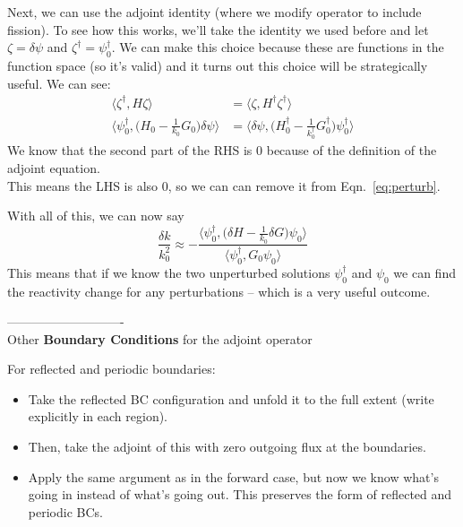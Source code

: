 \documentclass[12pt]{article}
\begin{document}
Next, we can use the adjoint identity (where we modify operator to include fission). To see how this works, we'll take the identity we used before and let $\zeta = \delta\psi$ and $\zeta^{\dagger} = \psi_0^{\dagger}$. We can make this choice because these are functions in the function space (so it's valid) and it turns out this choice will be strategically useful. We can see:
\begin{align*}
\langle\zeta^{\dagger}, H \zeta\rangle &= \langle\zeta, H^{\dagger} \zeta^{\dagger}\rangle \\
%
\langle \psi_0^{\dagger}, \bigl(H_0 - \frac{1}{k_0}G_0 \bigr)\delta \psi \rangle &= \langle \delta \psi,  \bigl(H_0^{\dagger} - \frac{1}{k_0^{\dagger}}G_0^{\dagger} \bigr)\psi_0^{\dagger} \rangle
\end{align*}
We know that the second part of the RHS is $0$ because of the definition of the adjoint equation.\\
This means the LHS is also $0$, so we can can remove it from Eqn.~\ref{eq:perturb}.

With all of this, we can now say
\[
\frac{\delta k}{k_0^2} \approx -\frac{\langle \psi_0^{\dagger},\bigl(\delta H - \frac{1}{k_0}\delta G\bigr)\psi_0 \rangle}{\langle \psi_0^{\dagger}, G_0\psi_0 \rangle}
\]
This means that if we know the two unperturbed solutions $\psi_0^{\dagger}$ and $\psi_0$ we can find the reactivity change for any perturbations -- which is a very useful outcome.

----------------------------\\
Other \textbf{Boundary Conditions} for the adjoint operator

For reflected and periodic boundaries:
\begin{itemize}
\item Take the reflected BC configuration and unfold it to the full extent (write explicitly in each region).
\item Then, take the adjoint of this with zero outgoing flux at the boundaries.
\item Apply the same argument as in the forward case, but now we know what's going in instead of what's going out. This preserves the form of reflected and periodic BCs.
\end{itemize}
\end{document}
